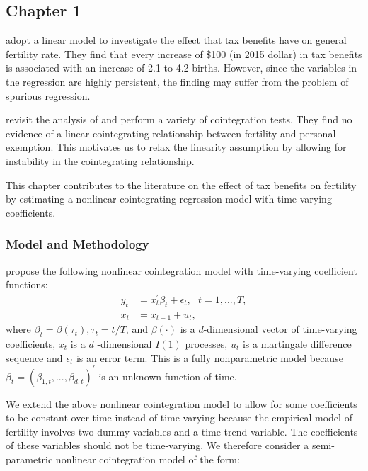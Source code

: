 \documentclass[a4paper,12pt,times,numbered,print,index]{report}
\numberwithin{equation}{section}
\begin{document}
	\subsection*{Chapter 1}
	
	\cite{whittington1990fertility} adopt a linear model to investigate the effect that tax benefits have on general fertility rate. They find that every increase of \$100 (in 2015 dollar) in tax benefits is associated with an increase of 2.1 to 4.2 births. However, since the variables in the regression are highly persistent, the finding may suffer from the problem of spurious regression. 
	
	\cite{crump2011fertility} revisit the analysis of \cite{whittington1990fertility} and perform a variety of cointegration tests. They find no evidence of a linear cointegrating relationship between fertility and personal exemption. This motivates us to relax the linearity assumption by allowing for instability in the cointegrating relationship.
	
	This chapter contributes to the literature on the effect of tax benefits on fertility by estimating a nonlinear cointegrating regression model with time-varying coefficients.
	
	\subsubsection*{Model and Methodology}
	\cite{phillips2017estimating} propose the following nonlinear cointegration
	model with time-varying coefficient functions:%
	\begin{align*}
		y_{t} &= x_{t}^{\prime }\beta _{t}+\epsilon _{t},\ \ \ t=1,...,T,
		\\
		x_{t} &= x_{t-1}+u_{t},  \nonumber
	\end{align*}%
	where $\beta _{t}=\beta \left( \tau _{t}\right) ,\tau _{t}=t/T$, and $\beta \left(
	\cdot \right) $ is a $d$-dimensional vector of time-varying coefficients, $x_{t}$ is a $d$%
	-dimensional $I\left( 1\right) $ processes, $u_{t}$ is a martingale difference sequence and $\epsilon _{t}$ is an error term. This is a fully nonparametric model because $\beta _{t}=\left( \beta _{1,t},...,\beta _{d,t}\right)
	^{\prime }$ is an unknown function of time. 
	
	We extend the above nonlinear cointegration model to allow for some coefficients to be constant over time instead of time-varying because
	the empirical model of fertility involves two dummy variables and a time trend variable. The coefficients of these variables should not be time-varying. We therefore consider a semi-parametric nonlinear cointegration model of the form:%
	
\end{document}
